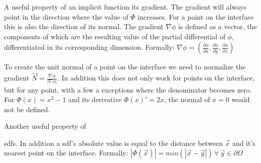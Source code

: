 A useful property of an implicit function its gradient. The gradient will always point in the direction where the value of $\Phi$ increases. For a point on the interface this is also the direction of its normal. The gradient $\nabla\phi$ is defined as a vector, the components of which are the resulting value of the partial differential of $\phi$, differentiated in its corresponding dimension. Formally: $\nabla\phi = (\frac{\partial\phi}{\partial x},\frac{\partial\phi}{\partial y},\frac{\partial\phi}{\partial z})$ 

To create the unit normal of a point on the interface we need to normalize the gradient $\vec{N} = \frac{\nabla\phi}{|\nabla\phi|}$. In addition this does not only work for points on the interface, but for any point, with a few a exceptions where the denominator becomes zero. For $\Phi(x) = x^2 - 1$ and its derivative $\Phi(x)' = 2x$, the normal of $x = 0$ would not be defined.

Another useful property of 

\glspl{sdf}.
In addition a \gls{sdf}'s absolute value is equal to the distance between $\vec{x}$ and it's nearest point on the interface. Formally:  $|\Phi(\vec{x})| = min(|\vec{x} - \vec{y}|) \, \forall \, \vec{y} \in \partial\Omega$







